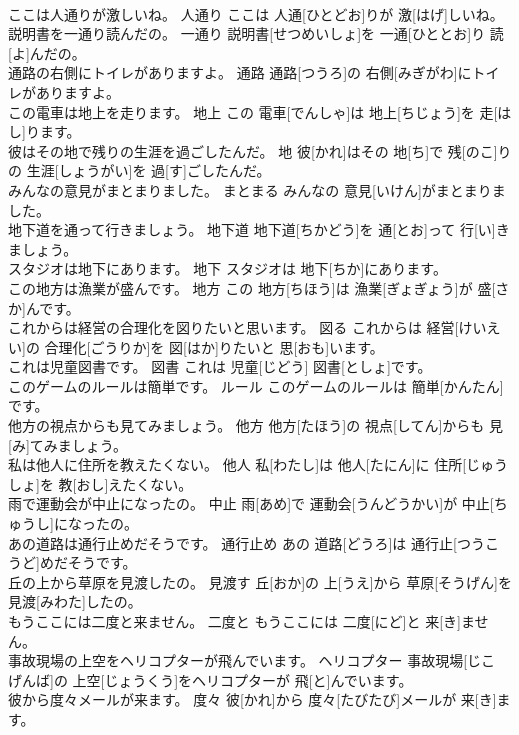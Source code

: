 \documentclass[8pt]{extreport}
\begin{document}
\begin{CJK}{UTF8}{min}
\\	ここは人通りが激しいね。	人通り	ここは 人通[ひとどお]りが 激[はげ]しいね。	
\\	説明書を一通り読んだの。	一通り	説明書[せつめいしょ]を 一通[ひととお]り 読[よ]んだの。	
\\	通路の右側にトイレがありますよ。	通路	通路[つうろ]の 右側[みぎがわ]にトイレがありますよ。	
\\	この電車は地上を走ります。	地上	この 電車[でんしゃ]は 地上[ちじょう]を 走[はし]ります。	
\\	彼はその地で残りの生涯を過ごしたんだ。	地	彼[かれ]はその 地[ち]で 残[のこ]りの 生涯[しょうがい]を 過[す]ごしたんだ。	
\\	みんなの意見がまとまりました。	まとまる	みんなの 意見[いけん]がまとまりました。	
\\	地下道を通って行きましょう。	地下道	地下道[ちかどう]を 通[とお]って 行[い]きましょう。	
\\	スタジオは地下にあります。	地下	スタジオは 地下[ちか]にあります。	
\\	この地方は漁業が盛んです。	地方	この 地方[ちほう]は 漁業[ぎょぎょう]が 盛[さか]んです。	
\\	これからは経営の合理化を図りたいと思います。	図る	これからは 経営[けいえい]の 合理化[ごうりか]を 図[はか]りたいと 思[おも]います。	
\\	これは児童図書です。	図書	これは 児童[じどう] 図書[としょ]です。	
\\	このゲームのルールは簡単です。	ルール	このゲームのルールは 簡単[かんたん]です。	
\\	他方の視点からも見てみましょう。	他方	他方[たほう]の 視点[してん]からも 見[み]てみましょう。	
\\	私は他人に住所を教えたくない。	他人	私[わたし]は 他人[たにん]に 住所[じゅうしょ]を 教[おし]えたくない。	
\\	雨で運動会が中止になったの。	中止	雨[あめ]で 運動会[うんどうかい]が 中止[ちゅうし]になったの。	
\\	あの道路は通行止めだそうです。	通行止め	あの 道路[どうろ]は 通行止[つうこうど]めだそうです。	
\\	丘の上から草原を見渡したの。	見渡す	丘[おか]の 上[うえ]から 草原[そうげん]を 見渡[みわた]したの。	
\\	もうここには二度と来ません。	二度と	もうここには 二度[にど]と 来[き]ません。	
\\	事故現場の上空をヘリコプターが飛んでいます。	ヘリコプター	事故現場[じこ げんば]の 上空[じょうくう]をヘリコプターが 飛[と]んでいます。	
\\	彼から度々メールが来ます。	度々	彼[かれ]から 度々[たびたび]メールが 来[き]ます。	

\end{CJK}
\end{document}
